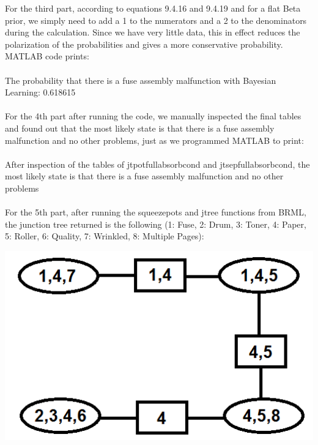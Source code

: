 \documentclass[11pt,a4paper,oneside]{report}
\begin{document}
For the third part, according to equations 9.4.16 and 9.4.19 and for a flat Beta prior, we simply need to add a 1 to the numerators and a 2 to the denominators during the calculation. Since we have very little data, this in effect reduces the polarization of the probabilities and gives a more conservative probability. MATLAB code prints:\\\\
The probability that there is a fuse assembly malfunction with Bayesian Learning: 0.618615\\\\

For the 4th part after running the code, we manually inspected the final tables and found out that the most likely state is that there is a fuse assembly malfunction and no other problems, just as we programmed MATLAB to print:\\\\
After inspection of the tables of jtpotfullabsorbcond and jtsepfullabsorbcond, the most likely state is that there is a fuse assembly malfunction and no other problems\\\\

For the 5th part, after running the squeezepots and jtree functions from BRML, the junction tree returned is the following (1: Fuse, 2: Drum, 3: Toner, 4: Paper, 5: Roller, 6: Quality, 7: Wrinkled, 8: Multiple Pages):\\

	\begin{center} \includegraphics[width=1\textwidth]{c9e1junctiontree}\end{center}
	
\end{document}
